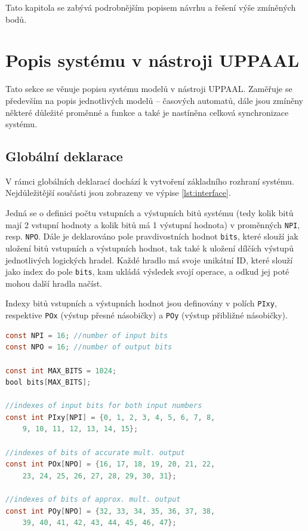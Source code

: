 Tato kapitola se zabývá podrobnějším popisem návrhu a řešení výše zmíněných bodů.

\section{Popis systému v nástroji UPPAAL}
Tato sekce se věnuje popisu systému modelů v nástroji UPPAAL. Zaměřuje se především na popis jednotlivých modelů -- časových automatů, dále jsou zmíněny některé důležité proměnné a funkce a také je nastíněna celková synchronizace systému.

\subsection{Globální deklarace}
V rámci globálních deklarací dochází k vytvoření základního rozhraní systému. Nejdůležitější součásti jsou zobrazeny ve výpise \ref{lst:interface}. 

Jedná se o definici počtu vstupních a výstupních bitů systému (tedy kolik bitů mají 2 vstupní hodnoty a kolik bitů má 1 výstupní hodnota) v proměnných \texttt{NPI}, resp. \texttt{NPO}. Dále je deklarováno pole pravdivostních hodnot \texttt{bits}, které slouží jak uložení bitů vstupních a výstupních hodnot, tak také k uložení dílčích výstupů jednotlivých logických hradel. Každé hradlo má svoje unikátní ID, které slouží jako index do pole \texttt{bits}, kam ukládá výsledek svojí operace, a odkud jej poté mohou další hradla načíst.

Indexy bitů vstupních a výstupních hodnot jsou definovány v polích \texttt{PIxy}, respektive \texttt{POx} (výstup přesné násobičky) a \texttt{POy} (výstup přibližné násobičky).

\begin{lstlisting}[language={C}, caption={Základní rozhraní systému}, label={lst:interface}]
const NPI = 16; //number of input bits
const NPO = 16; //number of output bits

const int MAX_BITS = 1024;
bool bits[MAX_BITS];

//indexes of input bits for both input numbers
const int PIxy[NPI] = {0, 1, 2, 3, 4, 5, 6, 7, 8,
    9, 10, 11, 12, 13, 14, 15};

//indexes of bits of accurate mult. output
const int POx[NPO] = {16, 17, 18, 19, 20, 21, 22,
    23, 24, 25, 26, 27, 28, 29, 30, 31};

//indexes of bits of approx. mult. output
const int POy[NPO] = {32, 33, 34, 35, 36, 37, 38,
    39, 40, 41, 42, 43, 44, 45, 46, 47};
\end{lstlisting}

